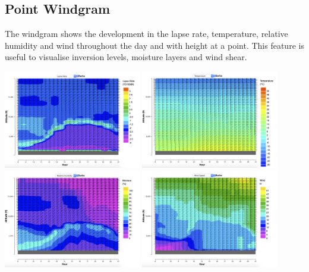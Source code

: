 \documentclass[11pt,a4paper]{article}
\begin{document}
\subsection{Point Windgram}
The windgram shows the development in the lapse rate, temperature, relative humidity and wind throughout the day and with height at a point. This feature is useful to visualise inversion levels, moisture layers and wind shear.
\begin{center}
\includegraphics[width=6cm]{images/windgram_lapse.png}
\includegraphics[width=6cm]{images/windgram_temp.png}\\
\includegraphics[width=6cm]{images/windgram_humid.png}
\includegraphics[width=6cm]{images/windgram_wind.png}
\end{center}
\end{document}
